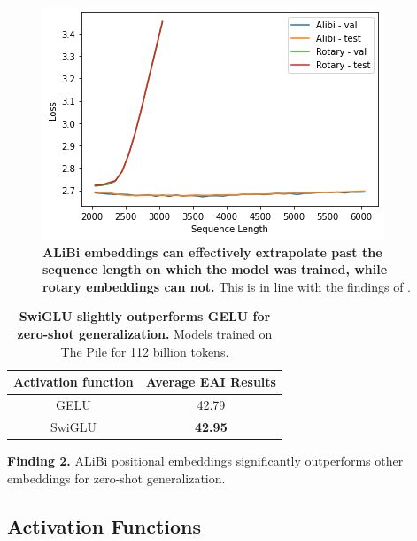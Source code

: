 \begin{figure}[h]
    \centering
    \includegraphics[width=\columnwidth]{figures/extrapolation.png}
    \caption{\textbf{ALiBi embeddings can effectively extrapolate past the sequence length on which the model was trained, while rotary embeddings can not.} This is in line with the findings of \citet{press2021alibi}.}
    \label{fig:extrapolation}
\end{figure}

\begin{table}[b]
\begin{center}
\begin{tabular}{@{}cc@{}}
\toprule
\textbf{Activation function} & \textbf{Average EAI Results}\\
\midrule
GELU & 42.79\\
SwiGLU & \textbf{42.95}\\
\bottomrule
\end{tabular}
\end{center}
\caption{\textbf{SwiGLU slightly outperforms GELU for zero-shot generalization.} Models trained on The Pile for 112 billion tokens.}
\label{tab:activation}
\end{table}

\begin{mdframed}
\textbf{Finding 2.} ALiBi positional embeddings significantly outperforms other embeddings for zero-shot generalization.
\end{mdframed}


\subsection{Activation Functions}


